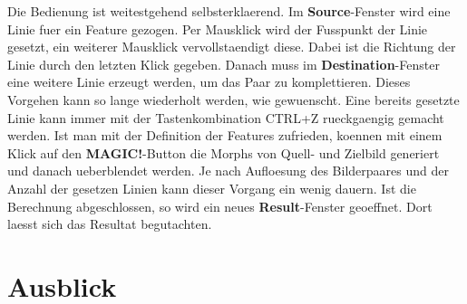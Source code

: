 Die Bedienung ist weitestgehend selbsterklaerend. Im \textbf{Source}-Fenster wird eine Linie fuer ein Feature gezogen. Per
Mausklick wird der Fusspunkt der Linie gesetzt, ein weiterer
Mausklick vervollstaendigt diese. Dabei ist die Richtung der Linie
durch den letzten Klick gegeben. Danach muss
im \textbf{Destination}-Fenster eine weitere Linie erzeugt werden, um das
Paar zu komplettieren. Dieses Vorgehen kann so lange wiederholt
werden, wie gewuenscht. Eine bereits gesetzte Linie kann immer mit
der Tastenkombination CTRL+Z rueckgaengig gemacht werden.
Ist man mit der Definition der Features zufrieden, koennen mit einem
Klick auf den \textbf{MAGIC!}-Button die Morphs von Quell- und Zielbild
generiert und danach ueberblendet werden. Je nach Aufloesung des Bilderpaares
und der Anzahl der gesetzen Linien kann dieser Vorgang ein wenig
dauern. Ist die Berechnung abgeschlossen, so wird ein
neues \textbf{Result}-Fenster geoeffnet. Dort laesst sich das
Resultat begutachten.

\section{Ausblick}



